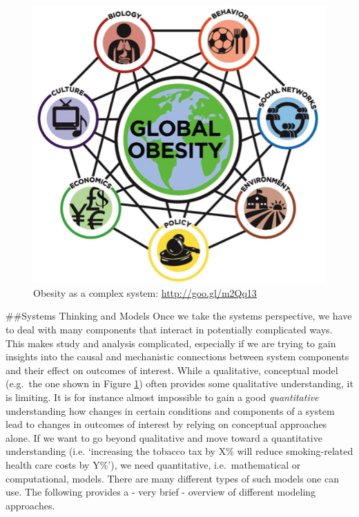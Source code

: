 \documentclass[]{book}
\theoremstyle{definition}
\theoremstyle{definition}
\theoremstyle{definition}
\theoremstyle{remark}
\begin{document}
\begin{figure}
\centering
\includegraphics{./images/complexsystem.png}
\caption{\label{fig:obesitysystem}Obesity as a complex system:
\url{http://goo.gl/m2Qq13}}
\end{figure}

\#\#Systems Thinking and Models Once we take the systems perspective, we
have to deal with many components that interact in potentially
complicated ways. This makes study and analysis complicated, especially
if we are trying to gain insights into the causal and mechanistic
connections between system components and their effect on outcomes of
interest. While a qualitative, conceptual model (e.g.~the one shown in
Figure \ref{fig:obesitysystem}) often provides some qualitative
understanding, it is limiting. It is for instance almost impossible to
gain a good \emph{quantitative} understanding how changes in certain
conditions and components of a system lead to changes in outcomes of
interest by relying on conceptual approaches alone. If we want to go
beyond qualitative and move toward a quantitative understanding (i.e.
`increasing the tobacco tax by X\% will reduce smoking-related health
care costs by Y\%'), we need quantitative, i.e.~mathematical or
computational, models. There are many different types of such models one
can use. The following provides a - very brief - overview of different
modeling approaches.
\end{document}
